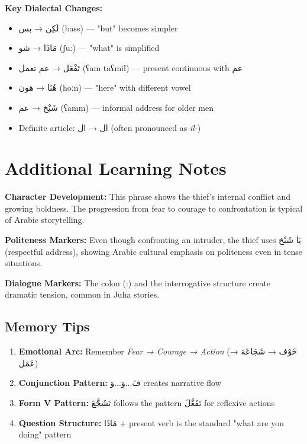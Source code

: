 \documentclass[a4paper,12pt]{article}
\begin{document}
\textbf{Key Dialectal Changes:}
\begin{itemize}
\item \textarabic{لَكِن} → \textarabic{بس} (bass) — "but" becomes simpler
\item \textarabic{مَاذَا} → \textarabic{شو} (ʃuː) — "what" is simplified
\item \textarabic{تَفْعَل} → \textarabic{عم تعمل} (ʕam taʕmil) — present continuous with \textarabic{عم}
\item \textarabic{هُنَا} → \textarabic{هون} (hoːn) — "here" with different vowel
\item \textarabic{شَيْخ} → \textarabic{عم} (ʕamm) — informal address for older men
\item Definite article: \textarabic{ال} → \textarabic{ال} (often pronounced as \textit{il-})
\end{itemize}

\section{Additional Learning Notes}

\begin{tcolorbox}[colback=boxcolor,colframe=accentcolor,title=\textbf{Cultural and Literary Context}]
\textbf{Character Development:} This phrase shows the thief's internal conflict and growing boldness. The progression from fear to courage to confrontation is typical of Arabic storytelling.

\textbf{Politeness Markers:} Even though confronting an intruder, the thief uses \textarabic{يَا شَيْخ} (respectful address), showing Arabic cultural emphasis on politeness even in tense situations.

\textbf{Dialogue Markers:} The colon (:) and the interrogative structure create dramatic tension, common in Juha stories.
\end{tcolorbox}

\subsection{Memory Tips}
\begin{enumerate}
\item \textbf{Emotional Arc:} Remember \textit{Fear → Courage → Action} (\textarabic{خَوْف → شَجَاعَة → عَمَل})
\item \textbf{Conjunction Pattern:} \textarabic{فَ...وَ...وَ} creates narrative flow
\item \textbf{Form V Pattern:} \textarabic{تَشَجَّعَ} follows the pattern \textarabic{تَفَعَّلَ} for reflexive actions
\item \textbf{Question Structure:} \textarabic{مَاذَا + present verb} is the standard "what are you doing" pattern
\end{enumerate}
\end{document}
